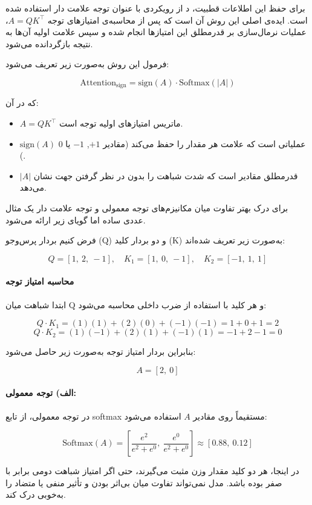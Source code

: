 برای حفظ این اطلاعات قطبیت، د از رویکردی با عنوان  توجه علامت دار استفاده شده است. ایده‌ی اصلی این روش آن است که پس از محاسبه‌ی امتیازهای توجه $A = QK^\top$، عملیات نرمال‌سازی  بر قدرمطلق این امتیازها انجام شده و سپس علامت اولیه آن‌ها به نتیجه بازگردانده می‌شود.

فرمول این روش به‌صورت زیر تعریف می‌شود:

\[
\text{Attention}_{\text{sign}} = \text{sign}(A) \cdot \text{Softmax}(|A|)
\]

که در آن:
\begin{itemize}
	\item $A = QK^\top$ ماتریس امتیازهای اولیه توجه است.
	\item $\text{sign}(A)$ عملیاتی است که علامت هر مقدار را حفظ می‌کند (مقادیر $+1$, $-1$ یا $0$).
	\item $|A|$ قدرمطلق مقادیر است که شدت شباهت را بدون در نظر گرفتن جهت نشان می‌دهد.
\end{itemize}


برای درک بهتر تفاوت میان مکانیزم‌های توجه معمولی و توجه علامت دار یک مثال عددی ساده اما گویای زیر ارائه می‌شود.

فرض کنیم  بردار پرس‌وجو (Q) و دو بردار کلید (K) به‌صورت زیر تعریف شده‌اند:

\[
Q = [1,\ 2,\ -1], \quad
K_1 = [1,\ 0,\ -1], \quad
K_2 = [-1,\ 1,\ 1]
\]

\paragraph{محاسبه امتیاز توجه}

ابتدا شباهت میان Q و هر کلید با استفاده از ضرب داخلی محاسبه می‌شود:

\[
Q \cdot K_1 = (1)(1) + (2)(0) + (-1)(-1) = 1 + 0 + 1 = 2
\]
\[
Q \cdot K_2 = (1)(-1) + (2)(1) + (-1)(1) = -1 + 2 -1 = 0
\]

بنابراین بردار امتیاز توجه به‌صورت زیر حاصل می‌شود:

\[
A = [2,\ 0]
\]

\paragraph{الف) توجه معمولی:}

در توجه معمولی، از تابع softmax مستقیماً روی مقادیر $A$ استفاده می‌شود:

\[
\text{Softmax}(A) =
\left[
\frac{e^2}{e^2 + e^0},\ 
\frac{e^0}{e^2 + e^0}
\right]
\approx [0.88,\ 0.12]
\]

در اینجا، هر دو کلید مقدار وزن مثبت می‌گیرند، حتی اگر امتیاز شباهت دومی برابر با صفر بوده باشد. مدل نمی‌تواند تفاوت میان بی‌اثر بودن و تأثیر منفی یا متضاد را به‌خوبی درک کند.

